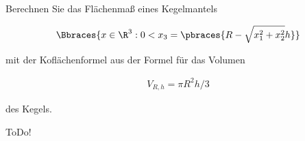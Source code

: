 
\begin{exercise}

Berechnen Sie das Flächenmaß eines Kegelmantels

\begin{align*}
    \Bbraces
    {
        x \in \R^3:
        0 < x_3 = \pbraces{R - \sqrt{x_1^2 + x_2^2} h}
    }
\end{align*}

mit der Koflächenformel aus der Formel für das Volumen

\begin{align*}
    V_{R, h} = \pi R^2 h / 3
\end{align*}

des Kegels.

\end{exercise}


\begin{solution}

ToDo!

\end{solution}

